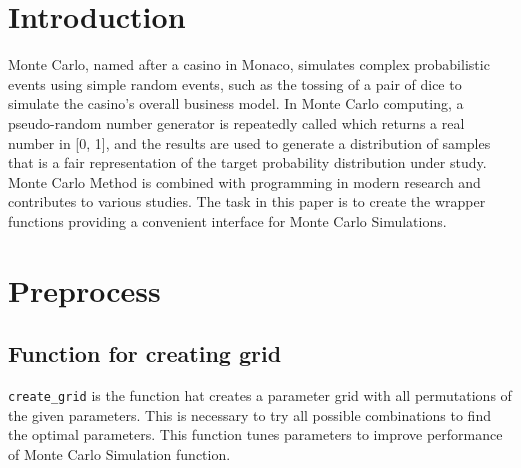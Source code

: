 \documentclass[11pt,a4paper]{article}
\begin{document}
\restoregeometry


{
\hypersetup{linkcolor=black}
\setcounter{tocdepth}{3}
\tableofcontents
}
\newpage
\listoftables
\newpage
\listoffigures
\newpage
{} 
\hypertarget{introduction}{%
\section{Introduction}\label{introduction}}

Monte Carlo, named after a casino in Monaco, simulates complex
probabilistic events using simple random events, such as the tossing of
a pair of dice to simulate the casino's overall business model. In Monte
Carlo computing, a pseudo-random number generator is repeatedly called
which returns a real number in {[}0, 1{]}, and the results are used to
generate a distribution of samples that is a fair representation of the
target probability distribution under study.
\autocite[Adrian\_2022]{Barbu} Monte Carlo Method is combined with
programming in modern research and contributes to various studies. The
task in this paper is to create the wrapper functions providing a
convenient interface for Monte Carlo Simulations.

\hypertarget{preprocess}{%
\section{Preprocess}\label{preprocess}}

\hypertarget{function-for-creating-grid}{%
\subsection{Function for creating
grid}\label{function-for-creating-grid}}

\texttt{create\_grid} is the function hat creates a parameter grid with
all permutations of the given parameters. This is necessary to try all
possible combinations to find the optimal parameters. This function
tunes parameters to improve performance of Monte Carlo Simulation
function.
\end{document}
